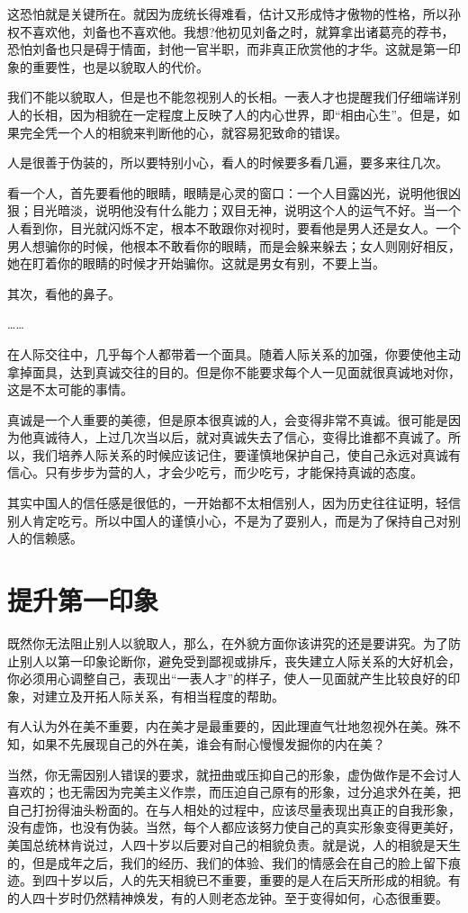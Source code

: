 \documentclass[fontset=fandol, a4paper, 12pt, openright]{ctexbook}
\begin{document}
这恐怕就是关键所在。就因为庞统长得难看，估计又形成恃才傲物的性格，所以孙权不喜欢他，刘备也不喜欢他。我想?他初见刘备之时，就算拿出诸葛亮的荐书，恐怕刘备也只是碍于情面，封他一官半职，而非真正欣赏他的才华。这就是第一印象的重要性，也是以貌取人的代价。

我们不能以貌取人，但是也不能忽视别人的长相。一表人才也提醒我们仔细端详别人的长相，因为相貌在一定程度上反映了人的内心世界，即“相由心生”。但是，如果完全凭一个人的相貌来判断他的心，就容易犯致命的错误。

人是很善于伪装的，所以要特别小心，看人的时候要多看几遍，要多来往几次。

看一个人，首先要看他的眼睛，眼睛是心灵的窗口：一个人目露凶光，说明他很凶狠；目光暗淡，说明他没有什么能力；双目无神，说明这个人的运气不好。当一个人看到你，目光就闪烁不定，根本不敢跟你对视时，要看他是男人还是女人。一个男人想骗你的时候，他根本不敢看你的眼睛，而是会躲来躲去；女人则刚好相反，她在盯着你的眼睛的时候才开始骗你。这就是男女有别，不要上当。

其次，看他的鼻子。

……

在人际交往中，几乎每个人都带着一个面具。随着人际关系的加强，你要使他主动拿掉面具，达到真诚交往的目的。但是你不能要求每个人一见面就很真诚地对你，这是不太可能的事情。

真诚是一个人重要的美德，但是原本很真诚的人，会变得非常不真诚。很可能是因为他真诚待人，上过几次当以后，就对真诚失去了信心，变得比谁都不真诚了。所以，我们培养人际关系的时候应该记住，要谨慎地保护自己，使自己永远对真诚有信心。只有步步为营的人，才会少吃亏，而少吃亏，才能保持真诚的态度。

其实中国人的信任感是很低的，一开始都不太相信别人，因为历史往往证明，轻信别人肯定吃亏。所以中国人的谨慎小心，不是为了耍别人，而是为了保持自己对别人的信赖感。

\section{提升第一印象}

既然你无法阻止别人以貌取人，那么，在外貌方面你该讲究的还是要讲究。为了防止别人以第一印象论断你，避免受到鄙视或排斥，丧失建立人际关系的大好机会，你必须用心调整自己，表现出“一表人才”的样子，使人一见面就产生比较良好的印象，对建立及开拓人际关系，有相当程度的帮助。

有人认为外在美不重要，内在美才是最重要的，因此理直气壮地忽视外在美。殊不知，如果不先展现自己的外在美，谁会有耐心慢慢发掘你的内在美？

当然，你无需因别人错误的要求，就扭曲或压抑自己的形象，虚伪做作是不会讨人喜欢的；也无需因为完美主义作祟，而压迫自己原有的形象，过分追求外在美，把自己打扮得油头粉面的。在与人相处的过程中，应该尽量表现出真正的自我形象，没有虚饰，也没有伪装。当然，每个人都应该努力使自己的真实形象变得更美好，美国总统林肯说过，人四十岁以后要对自己的相貌负责。就是说，人的相貌是天生的，但是成年之后，我们的经历、我们的体验、我们的情感会在自己的脸上留下痕迹。到四十岁以后，人的先天相貌已不重要，重要的是人在后天所形成的相貌。有的人四十岁时仍然精神焕发，有的人则老态龙钟。至于变得如何，心态很重要。
\end{document}
